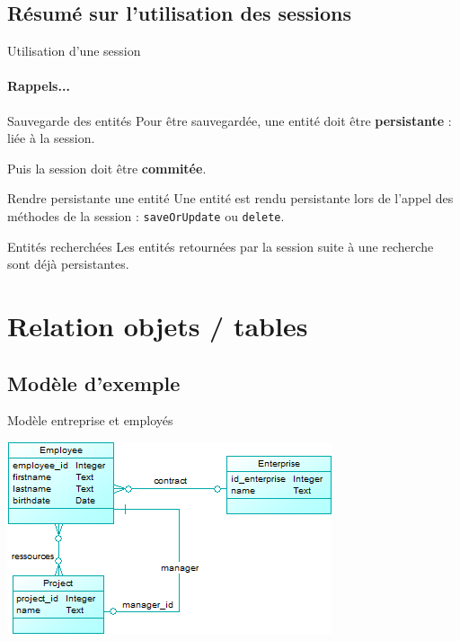 \documentclass[compress]{beamer}%
\begin{document}
\subsection{Résumé sur l'utilisation des sessions}

\begin{frame}{Utilisation d'une session}
	\framesubtitle{Rappels...}
	
	\begin{block}{Sauvegarde des entités}
	Pour être sauvegardée, une entité doit être \textbf{persistante} : liée à la session.\par
	Puis la session doit être \textbf{commitée}.
	\end{block}
	
	\pause
	\begin{block}{Rendre persistante une entité}
	Une entité est rendu persistante lors de l'appel des méthodes de la session : \texttt{saveOrUpdate} ou \texttt{delete}.
	\end{block}
	
	\pause
	\begin{block}{Entités recherchées}
	Les entités retournées par la session suite à une recherche sont déjà persistantes.
	\end{block}	
\end{frame}
	
\section{Relation objets / tables}

\subsection{Modèle d'exemple}

\begin{frame}{Modèle entreprise et employés}
	\begin{center}
	\includegraphics{images/model_employees_full.png}	
	\end{center}
\end{frame}
\end{document}
